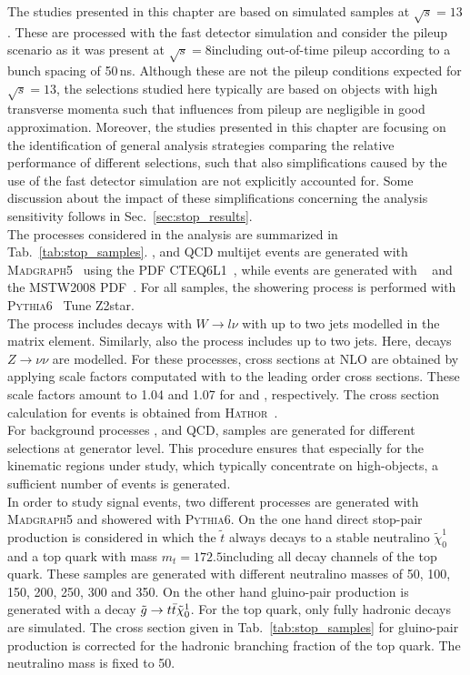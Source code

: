 The studies presented in this chapter are based on simulated samples at $\sqrt{s} = 13$\tev. These are processed with the fast detector simulation and consider the pileup scenario as it was present at $\sqrt{s} = 8$\tev including out-of-time pileup according to a bunch spacing of 50\,ns. Although these are not the pileup conditions expected for $\sqrt{s} = 13$\tev, the selections studied here typically are based on objects with high transverse momenta such that influences from pileup are negligible in good approximation. Moreover, the studies presented in this chapter are focusing on the identification of general analysis strategies comparing the relative performance of different selections, such that also simplifications caused by the use of the fast detector simulation are not explicitly accounted for. Some discussion about the impact of these simplifications concerning the analysis sensitivity follows in Sec.~\ref{sec:stop_results}.  \\
The processes considered in the analysis are summarized in Tab.~\ref{tab:stop_samples}. \WJets, \ZJets and QCD multijet events are generated with \textsc{Madgraph5}~\cite{Alwall:2007st} using the PDF CTEQ6L1~\cite{Pumplin:2002vw}, while \ttbar events are generated with \powheg~\cite{Oleari:2010nx} and the MSTW2008 PDF~\cite{Martin:2009iq}. For all samples, the showering process is performed with \textsc{Pythia6}~\cite{Sjostrand:2006za} Tune Z2star. \\
The process \WJets includes decays with $W \rightarrow l \nu$ with up to two jets modelled in the matrix element. Similarly, also the process \ZJets includes up to two jets. Here, decays $Z \rightarrow \nu \nu$ are modelled. For these processes, cross sections at NLO are obtained by applying scale factors computated with \powheg to the leading order cross sections. These scale factors amount to 1.04 and 1.07 for \WJets and \ZJets, respectively. The cross section calculation for \ttbar events is obtained from \textsc{Hathor}~\cite{Aliev:2010zk}. \\
For background processes \WJets, \ZJets and QCD, samples are generated for different \HT selections at generator level. This procedure ensures that especially for the kinematic regions under study, which typically concentrate on high-\pt objects, a sufficient number of events is generated. \\
In order to study signal events, two different processes are generated with \textsc{Madgraph5} and showered with \textsc{Pythia6}. On the one hand direct stop-pair production is considered in which the $\tilde{t}$ always decays to a stable neutralino $\tilde{\chi}_{0}^{1}$ and a top quark with mass $m_{t} = 172.5$\gev including all decay channels of the top quark. These samples are generated with different neutralino masses of 50, 100, 150, 200, 250, 300 and 350\gev. On the other hand gluino-pair production is generated with a decay $\tilde{g} \rightarrow t\bar{t} \tilde{\chi}_{0}^{1}$. For the top quark, only fully hadronic decays are simulated. The cross section given in Tab.~\ref{tab:stop_samples} for gluino-pair production is corrected for the hadronic branching fraction of the top quark. The neutralino mass is fixed to 50\gev. \\
